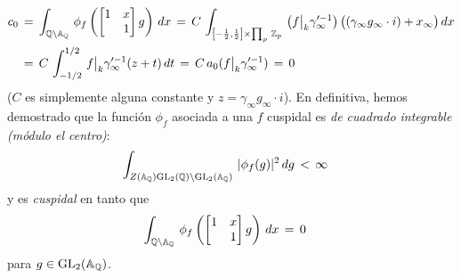 \begin{align*}
	c_{0} & \,=\,\int_{\bb{Q}\backslash\adeles{\bb{Q}}}\,
		\phi_{f}\left(
			\begin{bmatrix} 1 & x \\ & 1 \end{bmatrix} g\right)\,dx
		\,=\,C\,\int_{\left[-\frac{1}{2},\frac{1}{2}\right]\times%
					\prod_{p}\,\bb{Z}_{p}}\,
		\left(f\operadormatrices{k}{\gamma_{\infty}'^{-1}}\right)
		\big((\gamma_{\infty}g_{\infty}\cdot i)+x_{\infty}\big)\,dx \\
	& \,=\,C\,\int_{-1/2}^{1/2}\,
		f\operadormatrices{k}{\gamma_{\infty}'^{-1}} (z+t)\,dt
		\,=\,C\,a_{0}(f\operadormatrices{k}{\gamma_{\infty}'^{-1}})
		\,=\, 0
\end{align*}
%
($C$ es simplemente alguna constante y $z=\gamma_{\infty}g_{\infty}\cdot i$).
En definitiva, hemos demostrado que la funci\'{o}n $\phi_{f}$ asociada a una
$f$ cuspidal es \emph{de cuadrado integrable (m\'{o}dulo el centro)}:
\begin{align*}
	\int_{Z(\adeles{\bb{Q}})\GL_{2}(\bb{Q})\backslash%
		\GL_{2}(\adeles{\bb{Q}})}\,|\phi_{f}(g)|^{2}\,dg & \,<\,\infty
\end{align*}
%
y es \emph{cuspidal} en tanto que
\begin{align*}
	\int_{\mathbb{Q}\backslash\mathbb{A}_{\mathbb{Q}}}\,
		\phi_{f}\left(\begin{bmatrix} 1 & x \\ & 1 \end{bmatrix} g
			\right)\,dx
		& \,=\,0
\end{align*}
%
para $g\in\mathrm{GL}_{2}(\mathbb{A}_{\mathbb{Q}})$.

